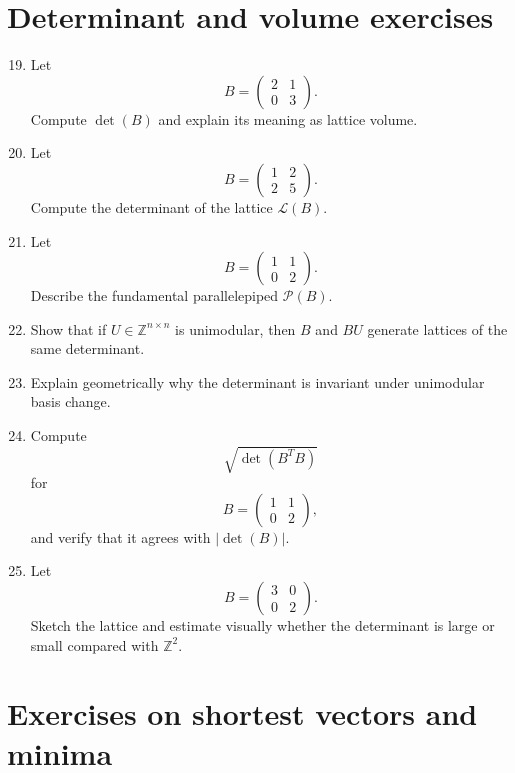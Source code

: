 \documentclass[11pt]{article}
\begin{document}
\section{Determinant and volume exercises}

\begin{enumerate}
	\setcounter{enumi}{18}
	\item Let
	\[
	B=
	\begin{pmatrix}
		2 & 1\\
		0 & 3
	\end{pmatrix}.
	\]
	Compute \(\det(B)\) and explain its meaning as lattice volume.
	
	\item Let
	\[
	B=
	\begin{pmatrix}
		1 & 2\\
		2 & 5
	\end{pmatrix}.
	\]
	Compute the determinant of the lattice \(\mathcal{L}(B)\).
	
	\item Let
	\[
	B=
	\begin{pmatrix}
		1 & 1\\
		0 & 2
	\end{pmatrix}.
	\]
	Describe the fundamental parallelepiped \(\mathcal{P}(B)\).
	
	\item Show that if \(U\in\mathbb{Z}^{n\times n}\) is unimodular, then \(B\) and \(BU\) generate lattices of the same determinant.
	
	\item Explain geometrically why the determinant is invariant under unimodular basis change.
	
	\item Compute
	\[
	\sqrt{\det(B^TB)}
	\]
	for
	\[
	B=
	\begin{pmatrix}
		1 & 1\\
		0 & 2
	\end{pmatrix},
	\]
	and verify that it agrees with \(|\det(B)|\).
	
	\item Let
	\[
	B=
	\begin{pmatrix}
		3 & 0\\
		0 & 2
	\end{pmatrix}.
	\]
	Sketch the lattice and estimate visually whether the determinant is large or small compared with \(\mathbb{Z}^2\).
\end{enumerate}

\section{Exercises on shortest vectors and minima}
\end{document}
